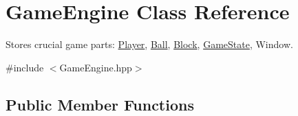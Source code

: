 \hypertarget{class_game_engine}{}\section{Game\+Engine Class Reference}
\label{class_game_engine}


Stores crucial game parts\+: \mbox{\hyperlink{class_player}{Player}}, \mbox{\hyperlink{class_ball}{Ball}}, \mbox{\hyperlink{class_block}{Block}}, \mbox{\hyperlink{class_game_state}{Game\+State}}, Window.  




{\ttfamily \#include $<$Game\+Engine.\+hpp$>$}

\subsection*{Public Member Functions}
